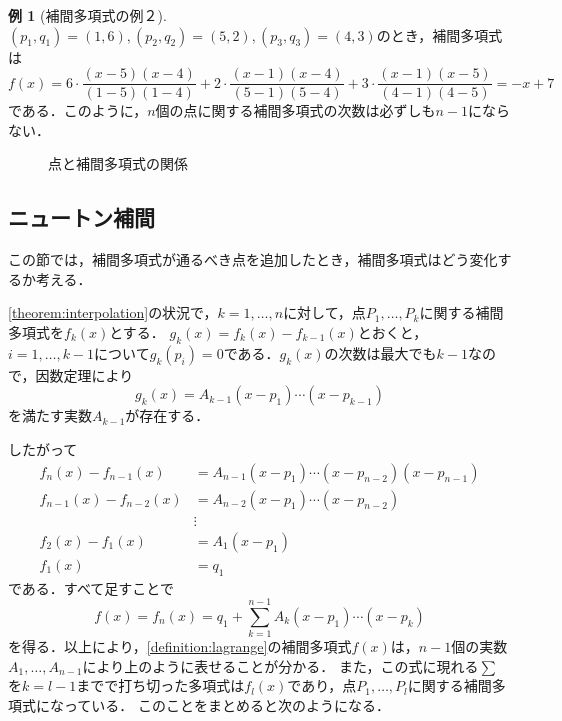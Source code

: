 \documentclass[a4paper]{ltjsarticle}
\theoremstyle{definition}
\newtheorem{example}{例}[section]
\begin{document}
\begin{example}[補間多項式の例２]
  \label{example:lagrange_2}
  $(p_1,q_1)=(1,6),(p_2,q_2)=(5,2),(p_3,q_3)=(4,3)$のとき，補間多項式は
  \[
    f(x)
    = 6\cdot\frac{(x-5)(x-4)}{(1-5)(1-4)} + 2\cdot\frac{(x-1)(x-4)}{(5-1)(5-4)} + 3\cdot\frac{(x-1)(x-5)}{(4-1)(4-5)}
    = -x+7
  \]
  である．このように，$n$個の点に関する補間多項式の次数は必ずしも$n-1$にならない．
\end{example}

\begin{figure}[H]
  \centering
  \caption{点と補間多項式の関係}
\end{figure}

\subsection{ニュートン補間}

この節では，補間多項式が通るべき点を追加したとき，補間多項式はどう変化するか考える．

\cref{theorem:interpolation}の状況で，$k=1,\dots,n$に対して，点$P_1,\dots,P_k$に関する補間多項式を$f_k(x)$とする．
$g_k(x) = f_k(x) - f_{k-1}(x)$とおくと，$i = 1,\dots,k-1$について$g_k(p_i)=0$である．$g_k(x)$の次数は最大でも$k-1$なので，因数定理により
\[
  g_k(x) = A_{k-1}(x-p_1)\cdots (x-p_{k-1})
\]
を満たす実数$A_{k-1}$が存在する．

したがって
\begin{align*}
  f_n(x) - f_{n-1}(x) &= A_{n-1}(x-p_1)\cdots (x-p_{n-2})(x-p_{n-1}) \\
  f_{n-1}(x) - f_{n-2}(x) &= A_{n-2}(x-p_1)\cdots (x-p_{n-2}) \\
  &\vdots \\
  f_2(x) - f_1(x) &= A_1(x-p_1) \\
  f_1(x) &= q_1
\end{align*}
である．すべて足すことで
\[
  f(x) = f_n(x) = q_1 + \sum_{k=1}^{n-1} A_k(x-p_1)\cdots (x-p_k)
\]
を得る．以上により，\cref{definition:lagrange}の補間多項式$f(x)$は，$n-1$個の実数$A_1,\dots,A_{n-1}$により上のように表せることが分かる．
また，この式に現れる$\sum$を$k=l-1$までで打ち切った多項式は$f_l(x)$であり，点$P_1,\dots,P_l$に関する補間多項式になっている．
このことをまとめると次のようになる．
\end{document}
